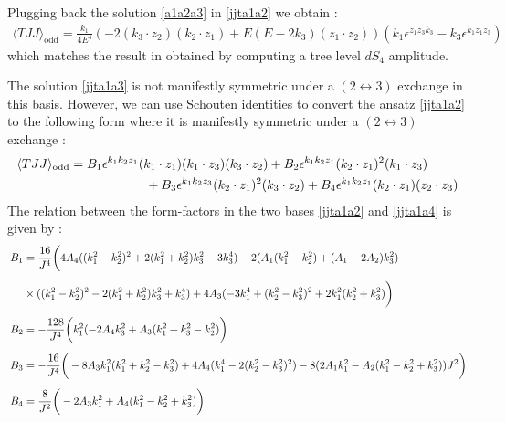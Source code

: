 \documentclass[a4paper,11pt]{article}
\begin{document}
Plugging back the solution \eqref{a1a2a3} in \eqref{jjta1a2} we obtain :
    \begin{align}\label{jjta1a3}
       \langle TJJ \rangle_{\text{odd}} = \frac{k_1}{4E^4} \left(-2(k_3 \cdot z_2)(k_2 \cdot z_1)+E(E-2k_3)(z_1 \cdot z_2)\right)\left(k_1 \epsilon^{z_1 z_3 k_3}-k_3\epsilon^{k_1 z_1 z_3}\right)
    \end{align}
    which matches the result in \cite{Jain:2021qcl} obtained by computing a tree level $dS_4$ amplitude.
   \par 
The solution \eqref{jjta1a3} is not manifestly symmetric under a $(2 \leftrightarrow 3)$ exchange in this basis. However, we can use Schouten identities to convert the ansatz \eqref{jjta1a2} to the following form where it is manifestly symmetric under a $(2 \leftrightarrow 3)$ exchange :
\begin{align}
\label{jjta1a4} 
\langle T J J\rangle_{\text{odd}}= B_1 \epsilon^{k_1 k_2 z_1}(k_1 \cdot z_1)&(k_1 \cdot z_3)(k_3 \cdot z_2)+B_2 \epsilon^{k_1 k_2 z_1}(k_2 \cdot z_1)^2(k_1 \cdot z_3)\notag\\
&\hspace{-1cm}+B_3 \epsilon^{k_1 k_2 z_3}(k_2 \cdot z_1)^2(k_3 \cdot z_2)+B_4\epsilon^{k_1 k_2 z_1}(k_2 \cdot z_1)(z_2 \cdot z_3)
\end{align}
 The relation between the form-factors in the two bases \eqref{jjta1a2} and \eqref{jjta1a4}  is given by :
\begin{align}
    \begin{split}
        B_1 &= \frac{16}{J^4}\bigg(4A_4((k_1^2-k_2^2)^2+2(k_1^2+k_2^2)k_3^2-3k_3^4)-2(A_1(k_1^2-k_2^2)+(A_1-2A_2)k_3^2)\bigg.\nonumber\\[5 pt]
        \hspace{.5cm}&\bigg.\times((k_1^2-k_2^2)^2-2(k_1^2+k_2^2)k_3^2+k_3^4)+4A_3(-3k_1^4+(k_2^2-k_3^2)^2+2k_1^2(k_2^2+k_3^2)\bigg)\\[5 pt]
        B_2 &= -\frac{128}{J^4}\bigg(k_1^2(-2A_4 k_3^2+A_3(k_1^2+k_3^2-k_2^2)\bigg)\\[5 pt]
        B_3 &= -\frac{16}{J^4}\bigg(-8A_3 k_1^2(k_1^2+k_2^2-k_3^2)+4A_4(k_1^4-2(k_2^2-k_3^2)^2)-8(2A_1 k_1^2-A_2(k_1^2-k_2^2+k_3^2))J^2\bigg)\\[5 pt]
        B_4 &= \frac{8}{J^2}\bigg(-2A_3 k_1^2+A_4(k_1^2-k_2^2+k_3^2)\bigg)
    \end{split}
    \end{align}
    
\end{document}
